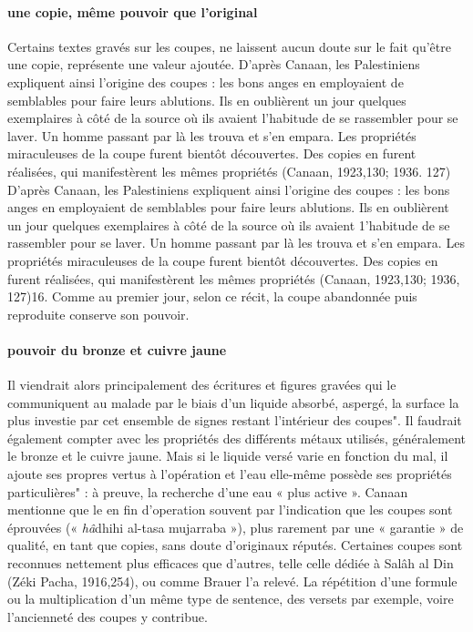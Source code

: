 \paragraph{une copie, même pouvoir que l'original}
Certains textes gravés sur les coupes, ne laissent aucun doute sur le fait qu'être une copie, représente une valeur ajoutée. D'après Canaan, les Palestiniens expliquent ainsi l'origine des coupes : les bons anges en employaient de semblables pour faire leurs ablutions. Ils en oublièrent un jour quelques exemplaires à côté de la source où ils avaient l'habitude de se rassembler pour se laver. Un homme passant par là les trouva et s'en empara. Les propriétés miraculeuses de la coupe furent bientôt découvertes. Des copies en furent réalisées, qui manifestèrent les mêmes propriétés (Canaan, 1923,130;
1936. 127) D'après Canaan, les Palestiniens expliquent
ainsi l'origine des coupes : les bons anges en employaient de semblables
pour faire leurs ablutions. Ils en oublièrent un jour quelques exemplaires
à côté de la source où ils avaient 1'habitude de se rassembler pour se
laver. Un homme passant par là les trouva et s'en empara. Les propriétés
miraculeuses de la coupe furent bientôt découvertes. Des copies en furent
réalisées, qui manifestèrent les mêmes propriétés (Canaan, 1923,130;
1936, 127)16.  
 Comme au premier jour, selon ce récit, la coupe abandonnée puis reproduite conserve son pouvoir.

 \paragraph{pouvoir du bronze et cuivre jaune}
Il viendrait alors principalement des écritures et figures gravées qui le communiquent au malade par le biais d'un liquide absorbé, aspergé, la surface la plus investie par cet ensemble de signes restant l'intérieur des coupes". Il faudrait également compter avec les propriétés des différents métaux utilisés, généralement le bronze et le cuivre jaune. Mais si le liquide versé varie en fonction du mal, il ajoute ses propres vertus à l'opération et l'eau elle-même possède ses propriétés particulières" : à preuve, la recherche d'une eau « plus active ». Canaan mentionne que le en fin d'operation
souvent par l'indication que les coupes sont éprouvées (« \textit{hâ}dhihi al-tasa mujarraba »), plus rarement par une « garantie » de qualité, en tant que copies, sans doute d'originaux réputés. Certaines coupes sont reconnues nettement plus efficaces que d'autres, telle celle dédiée à Salâh al Din (Zéki Pacha, 1916,254), ou comme Brauer l'a relevé. La répétition d'une formule ou la multiplication d'un même type de sentence, des versets par exemple, voire l'ancienneté des coupes y contribue. 
